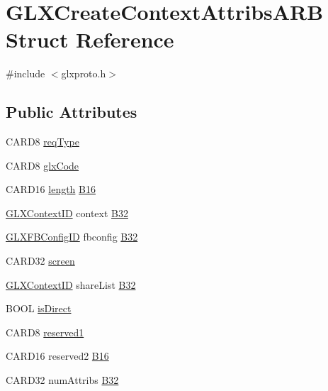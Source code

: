 \hypertarget{struct_g_l_x_create_context_attribs_a_r_b}{}\section{G\+L\+X\+Create\+Context\+Attribs\+A\+RB Struct Reference}
\label{struct_g_l_x_create_context_attribs_a_r_b}


{\ttfamily \#include $<$glxproto.\+h$>$}

\subsection*{Public Attributes}
\begin{DoxyCompactItemize}
\item 
C\+A\+R\+D8 \hyperlink{struct_g_l_x_create_context_attribs_a_r_b_ac14f7d55ce673944fe89716144133b25}{req\+Type}
\item 
C\+A\+R\+D8 \hyperlink{struct_g_l_x_create_context_attribs_a_r_b_a22f99b9f079a96d7fb5b156c0c5be86e}{glx\+Code}
\item 
C\+A\+R\+D16 \hyperlink{glcorearb_8h_ab9c919755bde3b34349e23a32b4e0fa7}{length} \hyperlink{struct_g_l_x_create_context_attribs_a_r_b_ab8fef152947918d9d3205ec53a5136a1}{B16}
\item 
\hyperlink{glx_8h_a17c7ca5b76cc448032df0b5352803005}{G\+L\+X\+Context\+ID} context \hyperlink{struct_g_l_x_create_context_attribs_a_r_b_a313065a7ef5723e03276a80fe59d5859}{B32}
\item 
\hyperlink{glx_8h_a38e78acefebf732d1a0da441ad1de05f}{G\+L\+X\+F\+B\+Config\+ID} fbconfig \hyperlink{struct_g_l_x_create_context_attribs_a_r_b_a62ce9cbcc0055599a99f14cfd969dad8}{B32}
\item 
C\+A\+R\+D32 \hyperlink{struct_g_l_x_create_context_attribs_a_r_b_a2f89d31be05290cb74d6fbad699f26d7}{screen}
\item 
\hyperlink{glx_8h_a17c7ca5b76cc448032df0b5352803005}{G\+L\+X\+Context\+ID} share\+List \hyperlink{struct_g_l_x_create_context_attribs_a_r_b_a87c7013683ff370eae8291197ff9d055}{B32}
\item 
B\+O\+OL \hyperlink{struct_g_l_x_create_context_attribs_a_r_b_acf8d35d0e19f3fa3641a2be29f798aa0}{is\+Direct}
\item 
C\+A\+R\+D8 \hyperlink{struct_g_l_x_create_context_attribs_a_r_b_aee581a14113b2b93194c216bbb1d45dd}{reserved1}
\item 
C\+A\+R\+D16 reserved2 \hyperlink{struct_g_l_x_create_context_attribs_a_r_b_abd40e8ed59a72219a2ad6f98aac03576}{B16}
\item 
C\+A\+R\+D32 num\+Attribs \hyperlink{struct_g_l_x_create_context_attribs_a_r_b_aa9baf1ac5da41950f7b2d4c940e9938e}{B32}
\end{DoxyCompactItemize}


